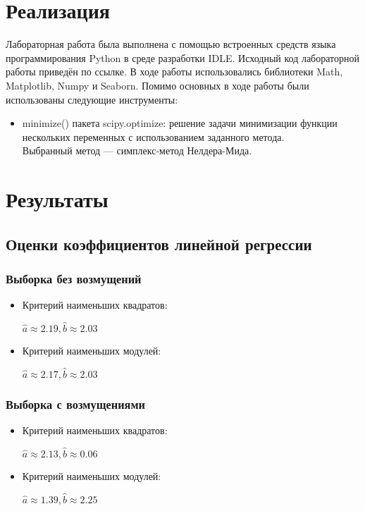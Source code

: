 \section{Реализация}
Лабораторная работа была выполнена с помощью встроенных средств языка программирования Python в среде разработки IDLE. Исходный код лабораторной работы приведён по ссылке. В ходе работы использовались библиотеки Math, Matplotlib, Numpy и Seaborn.
Помимо основных в ходе работы были использованы следующие инструменты:
\begin{itemize}
\item minimize() пакета scipy.optimize: решение задачи минимизации функции нескольких переменных с использованием заданного метода. \\ Выбранный метод — симплекс-метод Нелдера-Мида. \cite{SciPy}
\end{itemize}

\section{Результаты}
\subsection{Оценки коэффициентов линейной регрессии}
\subsubsection{Выборка без возмущений}

\begin{itemize}
\item Критерий наименьших квадратов: 
\begin{center}
$\hat{a} \approx 2.19, \hat{b} \approx 2.03$
\end{center}
\item Критерий наименьших модулей: 
\begin{center}
$\hat{a} \approx 2.17, \hat{b} \approx 2.03$
\end{center}
\end{itemize}

\subsubsection{Выборка с возмущениями}
\begin{itemize}
\item Критерий наименьших квадратов: 
\begin{center}
$\hat{a} \approx 2.13, \hat{b} \approx 0.06$
\end{center}
\item Критерий наименьших модулей:
\begin{center}
$\hat{a } \approx 1.39, \hat{b} \approx 2.25$
\end{center}
\end{itemize}

